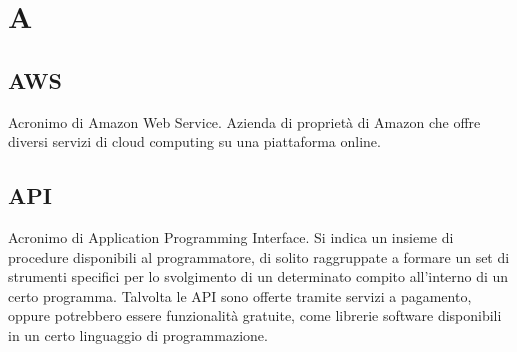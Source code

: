 \section*{A}
\markright{}
\subsection*{AWS}
Acronimo di Amazon Web Service. Azienda di proprietà di Amazon che offre diversi servizi di cloud computing su una piattaforma online.
\subsection*{API}
Acronimo di Application Programming Interface. Si indica un  insieme  di  procedure disponibili al programmatore, di solito  raggruppate a formare un set di strumenti specifici per lo svolgimento di un determinato compito all’interno di un certo programma. Talvolta le API sono offerte tramite servizi a pagamento, oppure potrebbero essere funzionalità gratuite, come librerie software disponibili in un certo linguaggio di programmazione.